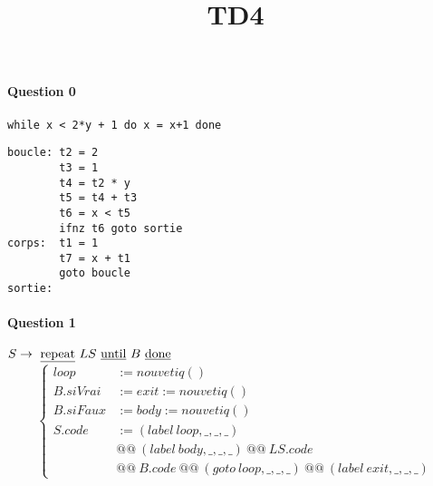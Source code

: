 \documentclass[a4paper, 11pt]{article}
\title{TD4}
\begin{document}
\maketitle

\paragraph{Question 0}

{\tt while x < 2*y + 1 do x = x+1 done}

\begin{verbatim}
boucle: t2 = 2
        t3 = 1
        t4 = t2 * y
        t5 = t4 + t3
        t6 = x < t5
        ifnz t6 goto sortie
corps:	t1 = 1
        t7 = x + t1
        goto boucle
sortie:
\end{verbatim}

\paragraph{Question 1}

\(S \to\ \text{\underline{repeat}}\ LS\ \text{\underline{until}}\ B\ \text{\underline{done}}\)
\[\left\{\begin{array}{ll}
loop     &:= nouvetiq() \\
B.siVrai &:= exit := nouvetiq() \\
B.siFaux &:= body := nouvetiq() \\
S.code   &:= (label\ loop,\_,\_,\_)\ \\
& @@\ (label\ body,\_,\_,\_)\ @@\ LS.code\ \\
& @@\ B.code\ @@\ (goto\ loop,\_,\_,\_)\ @@\ (label\ exit,\_,\_,\_)
\end{array}\right.\]
\end{document}
